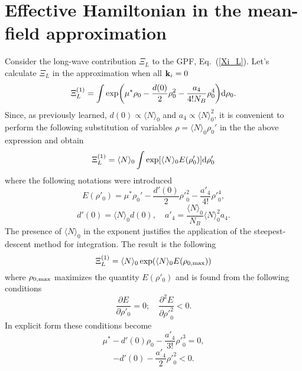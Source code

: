 \section{Effective Hamiltonian in the mean-field approximation}
Consider the long-wave contribution $\Xi_L$ to the GPF, Eq.~(\ref{Xi_L}). Let's calculate $\Xi_L$ in the approximation when all $\vb k_i=0$
\begin{equation}
	\Xi_L^{(1)} = \int \exp(\mu^*\rho_0 -\frac{d(0)}{2} \rho_0^2 - \frac{a_4}{4!N_B} \rho_0^4) {\rm d} \rho_0.
\end{equation}
Since, as previously learned, $d(0) \propto \langle N \rangle_0$ and $a_4 \propto \langle N \rangle_0^2$, it is convenient to perform the following substitution of variables $\rho = \langle N \rangle_0 \rho_0'$ in the the above expression and obtain
\begin{equation}
	\Xi_L^{(1)} = \langle N \rangle_0 \int \exp[\langle N \rangle_0 E(\rho'_0)] {\rm d} \rho'_0
\end{equation}
where the following notations were introduced
\begin{equation}
	E(\rho'_0) = \mu^*\rho_0' - \frac{d'(0)}{2} {\rho'}_0^2 - \frac{a'_4}{4!}{\rho'}_0^4,
\end{equation}
\begin{equation}
	d'(0) = \langle N \rangle_0 d(0), \quad a'_4 = \frac{\langle N \rangle_0}{N_B} \langle N \rangle_0^2 a_4.
\end{equation}
The presence of $\langle N \rangle_0$ in the exponent justifies the application of the steepest-descent method for integration. The result is the following
\begin{equation}
	\Xi_L^{(1)} = \langle N \rangle_0 \exp(\langle N \rangle_0 E(\rho_{0,{\rm max}}))
\end{equation}
where $\rho_{0,{\rm max}}$ maximizes the quantity $E(\rho'_0)$ and is found from the following conditions
\begin{equation}
	\frac{\partial E}{\partial \rho'_0} = 0; \quad \frac{\partial^2 E}{\partial {\rho'}_0^2} < 0.
\end{equation}
In explicit form these conditions become
\begin{equation}
	\mu^*-d'(0)\rho_0 - \frac{a'_4}{3!}{\rho'}_0^3 = 0,
\end{equation}
\begin{equation}
	-d'(0) - \frac{a'_4}{2}{\rho'}_0^2 < 0.
\end{equation}

